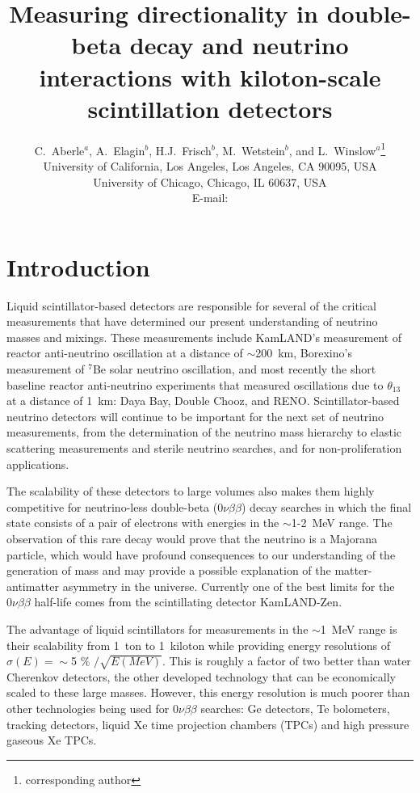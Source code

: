 \documentclass[cits]{JINST}
\title{Measuring directionality in double-beta decay and neutrino interactions with kiloton-scale scintillation detectors}
\author{C.~Aberle$^a$, A.~Elagin$^b$, H.J.~Frisch$^b$, M.~Wetstein$^b$, and L.~Winslow$^a$\setcounter{footnote}{0}\thanks{corresponding author}\\
\llap{$^a$}University of California, Los Angeles, Los Angeles, CA 90095, USA\\
\llap{$^b$}University of Chicago, Chicago, IL 60637, USA\\
  E-mail: \email{lwinslow@physics.ucla.edu}}
\begin{document}
\section{Introduction}
Liquid scintillator-based detectors are responsible for several of the
critical measurements that have determined our present understanding
of neutrino masses and mixings. These measurements include KamLAND's
measurement of reactor anti-neutrino oscillation at a distance of
$\sim$200~km\cite{kam2013}, Borexino's measurement of $^{7}$Be solar
neutrino oscillation\cite{borexino}, and most recently the short
baseline reactor anti-neutrino experiments that measured oscillations
due to $\theta_{13}$ at a distance of 1~km: Daya Bay\cite{dbtwo},
Double Chooz\cite{dctwo, dchydrogen}, and RENO\cite{reno}.
Scintillator-based neutrino detectors will continue to be important for the
next set of neutrino measurements, from the determination of the
neutrino mass hierarchy\cite{juno,reno50} to elastic scattering
measurements\cite{isodarscatt} and sterile neutrino
searches\cite{isodar,nist}, and for non-proliferation
applications\cite{nucifer, songs}.

The scalability of these detectors to large volumes also makes them
highly competitive for neutrino-less double-beta ($0\nu\beta\beta$)
decay searches in which the final state consists of a pair of
electrons with energies in the $\sim$1-2~MeV range.  The observation of this
rare decay would prove that the neutrino is a Majorana particle, which
would have profound consequences to our understanding of the generation of
mass and may provide a possible explanation of the matter-antimatter
asymmetry in the universe\cite{leptogenesis}.  Currently one of the best limits for the
$0\nu\beta\beta$ half-life comes from the scintillating detector
KamLAND-Zen\cite{KZ0nu}.

The advantage of liquid scintillators for measurements in the
$\sim$1~MeV range is their scalability from 1~ton to 1~kiloton while
providing energy resolutions of $\sigma(E)=\sim$5 \% $/\sqrt{E(MeV)}$\cite{kam2013,borexino}. This is roughly a factor of
two better than water Cherenkov detectors, the other developed
technology that can be economically scaled to these large
masses. However, this energy resolution is much poorer than other technologies being used for $0\nu\beta\beta$ searches: Ge detectors\cite{gerda2013}, Te bolometers\cite{Alessandria:2011rc}, tracking detectors\cite{SuperNEMO}, liquid Xe time projection chambers (TPCs)\cite{EXO2012} and high pressure gaseous Xe TPCs\cite{NEXTsipm}.  
\end{document}
